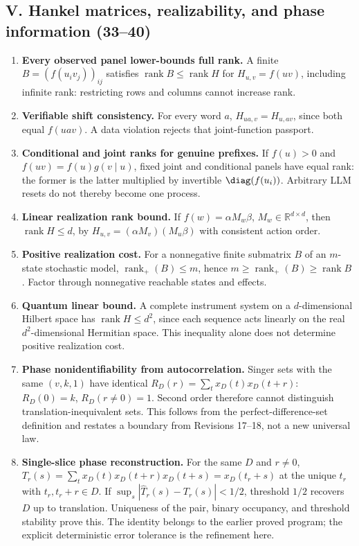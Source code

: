 \documentclass[11pt,a4paper,oneside]{book}
\newcommand{\R}{\mathbb R}\newcommand{\C}{\mathbb C}\newcommand{\Z}{\mathbb Z}\newcommand{\N}{\mathbb N}\newcommand{\Q}{\mathbb Q}
\DeclareMathOperator{\rank}{rank}\DeclareMathOperator{\Tr}{Tr}
\begin{document}
\subsection*{V. Hankel matrices, realizability, and phase information (33--40)}
\begin{enumerate}[start=33]
\item \textbf{Every observed panel lower-bounds full rank.} A finite $B=(f(u_iv_j))_{ij}$ satisfies $\rank B\le\rank H$ for $H_{u,v}=f(uv)$, including infinite rank: restricting rows and columns cannot increase rank.
\item \textbf{Verifiable shift consistency.} For every word $a$, $H_{ua,v}=H_{u,av}$, since both equal $f(uav)$. A data violation rejects that joint-function passport.
\item \textbf{Conditional and joint ranks for genuine prefixes.} If $f(u)>0$ and $f(uv)=f(u)g(v\mid u)$, fixed joint and conditional panels have equal rank: the former is the latter multiplied by invertible $\diag(f(u_i))$. Arbitrary LLM resets do not thereby become one process.
\item \textbf{Linear realization rank bound.} If $f(w)=\alpha M_w\beta$, $M_w\in\R^{d\times d}$, then $\rank H\le d$, by $H_{u,v}=(\alpha M_v)(M_u\beta)$ with consistent action order.
\item \textbf{Positive realization cost.} For a nonnegative finite submatrix $B$ of an $m$-state stochastic model, $\rank_+(B)\le m$, hence $m\ge\rank_+(B)\ge\rank B$. Factor through nonnegative reachable states and effects.
\item \textbf{Quantum linear bound.} A complete instrument system on a $d$-dimensional Hilbert space has $\rank H\le d^2$, since each sequence acts linearly on the real $d^2$-dimensional Hermitian space. This inequality alone does not determine positive realization cost.
\item \textbf{Phase nonidentifiability from autocorrelation.} Singer sets with the same $(v,k,1)$ have identical $R_D(r)=\sum_t x_D(t)x_D(t+r)$: $R_D(0)=k$, $R_D(r\ne0)=1$. Second order therefore cannot distinguish translation-inequivalent sets. This follows from the perfect-difference-set definition and restates a boundary from Revisions 17--18, not a new universal law.
\item \textbf{Single-slice phase reconstruction.} For the same $D$ and $r\ne0$, $T_r(s)=\sum_t x_D(t)x_D(t+r)x_D(t+s)=x_D(t_r+s)$ at the unique $t_r$ with $t_r,t_r+r\in D$. If $\sup_s|\widehat T_r(s)-T_r(s)|<1/2$, threshold $1/2$ recovers $D$ up to translation. Uniqueness of the pair, binary occupancy, and threshold stability prove this. The identity belongs to the earlier proved program; the explicit deterministic error tolerance is the refinement here.
\end{enumerate}
\end{document}

